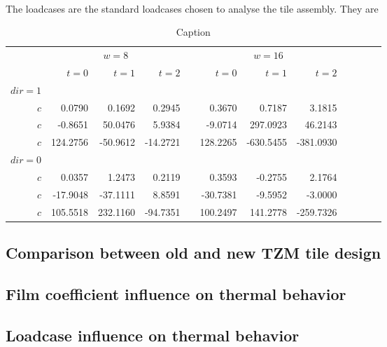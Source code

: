 \\
\break
\normalsize{\indent The loadcases are the standard loadcases chosen to analyse the tile assembly. They are }
\\
\break
\newpage



\newpage
\begin{table}\centering
{}
\begin{tabular}{@{}rrrrcrrrcrrr@{}}\toprule
& \multicolumn{3}{c}{$w = 8$} & \phantom{abc} & \multicolumn{3}{c}{$w = 16$}\\
\cmidrule{2-4} \cmidrule{6-8}
& $t=0$ & $t=1$ & $t=2$ && $t=0$ & $t=1$ & $t=2$\\ \midrule
$dir=1$\\
$c$ & 0.0790 & 0.1692 & 0.2945 && 0.3670 & 0.7187 & 3.1815\\
$c$ & -0.8651& 50.0476& 5.9384&& -9.0714& 297.0923& 46.2143\\
$c$ & 124.2756& -50.9612& -14.2721&& 128.2265& -630.5455& -381.0930\\
$dir=0$\\
$c$ & 0.0357& 1.2473& 0.2119&& 0.3593& -0.2755& 2.1764\\
$c$ & -17.9048& -37.1111& 8.8591&& -30.7381& -9.5952& -3.0000\\
$c$ & 105.5518& 232.1160& -94.7351&& 100.2497& 141.2778& -259.7326\\
\bottomrule
\end{tabular}
\caption{Caption}
\end{table}


\subsection{Comparison between old and new TZM tile design}
\subsection{Film coefficient influence on thermal behavior}
\subsection{Loadcase influence on thermal behavior}